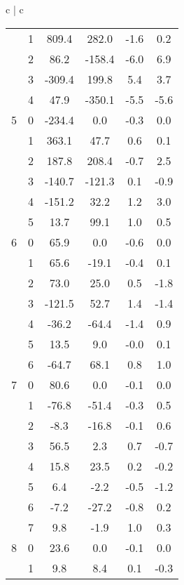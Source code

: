 \documentclass[11pt,dvipsnames]{thesis}
\begin{document}
\begin{table}[H]
{\begin{tabular}{c | c}
\begin{tabular}{cc S[table-format=-5.1] S[table-format=-4.1] S[table-format=-2.1] S[table-format=-2.1]}
   &  1&     809.4&     282.0&       -1.6&        0.2 \\
   &  2&      86.2&    -158.4&       -6.0&        6.9 \\
   &  3&    -309.4&     199.8&        5.4&        3.7 \\
   &  4&      47.9&    -350.1&       -5.5&       -5.6 \\
5  &  0&    -234.4&       0.0&       -0.3&        0.0 \\
   &  1&     363.1&      47.7&        0.6&        0.1 \\
   &  2&     187.8&     208.4&       -0.7&        2.5 \\
   &  3&    -140.7&    -121.3&        0.1&       -0.9 \\
   &  4&    -151.2&      32.2&        1.2&        3.0 \\
   &  5&      13.7&      99.1&        1.0&        0.5 \\
6  &  0&      65.9&       0.0&       -0.6&        0.0 \\
   &  1&      65.6&     -19.1&       -0.4&        0.1 \\
   &  2&      73.0&      25.0&        0.5&       -1.8 \\
   &  3&    -121.5&      52.7&        1.4&       -1.4 \\
   &  4&     -36.2&     -64.4&       -1.4&        0.9 \\
   &  5&      13.5&       9.0&       -0.0&        0.1 \\
   &  6&     -64.7&      68.1&        0.8&        1.0 \\
7  &  0&      80.6&       0.0&       -0.1&        0.0 \\
   &  1&     -76.8&     -51.4&       -0.3&        0.5 \\
   &  2&      -8.3&     -16.8&       -0.1&        0.6 \\
   &  3&      56.5&       2.3&        0.7&       -0.7 \\
   &  4&      15.8&      23.5&        0.2&       -0.2 \\
   &  5&       6.4&      -2.2&       -0.5&       -1.2 \\
   &  6&      -7.2&     -27.2&       -0.8&        0.2 \\
   &  7&       9.8&      -1.9&        1.0&        0.3 \\
8  &  0&      23.6&       0.0&       -0.1&        0.0 \\
   &  1&       9.8&       8.4&        0.1&       -0.3 \\

\end{tabular}
\end{tabular}}
\end{table}
\end{document}
